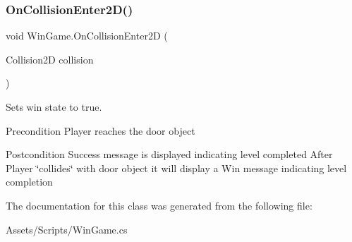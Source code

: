 \subsubsection{\texorpdfstring{On\+Collision\+Enter2\+D()}{OnCollisionEnter2D()}}
{\footnotesize\ttfamily void Win\+Game.\+On\+Collision\+Enter2D (\begin{DoxyParamCaption}\item[{Collision2D}]{collision }\end{DoxyParamCaption})\hspace{0.3cm}{\ttfamily [inline]}}

Sets win state to true. \begin{DoxyPrecond}{Precondition}
Player reaches the door object 
\end{DoxyPrecond}
\begin{DoxyPostcond}{Postcondition}
Success message is displayed indicating level completed After Player \char`\"{}collides\char`\"{} with door object it will display a Win message indicating level completion 
\end{DoxyPostcond}


The documentation for this class was generated from the following file\+:\begin{DoxyCompactItemize}
\item 
Assets/\+Scripts/Win\+Game.\+cs\end{DoxyCompactItemize}
